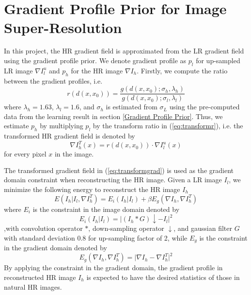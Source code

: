 \documentclass[a4paper,11pt]{article}
\begin{document}
\section{Gradient Profile Prior for Image Super-Resolution}
\label{sec:Gradient Profile Prior for Image Super-Resolution}

In this project, the HR gradient field is approximated from the LR gradient field using the gradient profile prior. We denote gradient profile as $p_l$ for up-sampled LR image $\nabla I_l^u$ and $p_h$ for the HR image $\nabla I_h$. Firstly, we compute the ratio between the gradient profiles, i.e.
\begin{equation}
	\label{eq:transformr}
	r(d(x, x_0)) = \frac{g(d(x, x_0); \sigma_h, \lambda_h)}{g(d(x, x_0); \sigma_l, \lambda_l)}
\end{equation}
where $\lambda_h=1.63$, $\lambda_l=1.6$, and $\sigma_h$ is estimated from $\sigma_L$ using the pre-computed data from the learning result in section \ref{Gradient Profile Prior}. Thus, we estimate $p_h$ by multiplying $p_l$ by the transform ratio in (\ref{eq:transformr}), i.e. the transformed HR gradient field is denoted by
\begin{equation}
	\label{eq:transformgrad}
	\nabla I_h^T(x) = r(d(x, x_0)) \cdot \nabla I_l^u(x)
\end{equation}
for every pixel $x$ in the image.

The transformed gradient field in (\ref{eq:transformgrad}) is used as the gradient domain constraint when reconstructing the HR image. Given a LR image $I_l$, we minimize the following energy to reconstruct the HR image $I_h$
\begin{equation}
	\label{eq:energy1}
	E(I_h | I_l, \nabla I_h^T) = E_i(I_h | I_l) + \beta E_g(\nabla I_h, \nabla I_h^T) 
\end{equation}
where $E_i$ is the constraint in the image domain denoted by
\begin{equation}
	\label{eq:energyi}
	E_i(I_h | I_l) = \lvert (I_h \ast G) \downarrow - I_l \rvert^2
\end{equation}
,with convolution operator $\ast$, down-sampling operator $\downarrow$, and gaussian filter $G$ with standard deviation 0.8 for up-sampling factor of 2, while $E_g$ is the constraint in the gradient domain denoted by
\begin{equation}
	\label{eq:energyg}
	E_g(\nabla I_h, \nabla I_h^T) = \lvert \nabla I_h - \nabla I_h^T \rvert^2
\end{equation}
By applying the constraint in the gradient domain, the gradient profile in reconstructed HR image $I_h$ is expected to have the desired statistics of those in natural HR images.
\end{document}
